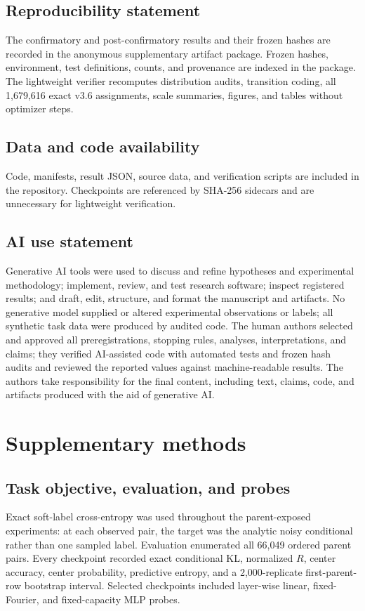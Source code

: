 \documentclass{article}
\begin{document}
\subsection*{Reproducibility statement}
The confirmatory and post-confirmatory results and their frozen hashes are
recorded in the anonymous supplementary artifact package. Frozen hashes,
environment, test definitions, counts, and provenance are indexed in the
package. The lightweight verifier recomputes distribution audits, transition
coding, all 1,679,616 exact v3.6 assignments, scale summaries, figures, and
tables without optimizer steps.

\subsection*{Data and code availability}
Code, manifests, result JSON, source data, and verification scripts are
included in the repository. Checkpoints are referenced by SHA-256 sidecars and
are unnecessary for lightweight verification.

\subsection*{AI use statement}
Generative AI tools were used to discuss and refine hypotheses and experimental
methodology; implement, review, and test research software; inspect registered
results; and draft, edit, structure, and format the manuscript and artifacts.
No generative model supplied or altered experimental observations or labels;
all synthetic task data were produced by audited code. The human authors
selected and approved all
preregistrations, stopping rules, analyses, interpretations, and claims; they
verified AI-assisted code with automated tests and frozen hash audits and
reviewed the reported values against machine-readable results. The authors take
responsibility for the final content, including text, claims, code, and
artifacts produced with the aid of generative AI.




\appendix
\section{Supplementary methods}
\subsection{Task objective, evaluation, and probes}
Exact soft-label cross-entropy was used throughout the parent-exposed
experiments: at each observed pair, the target was the analytic noisy
conditional rather than one sampled label. Evaluation enumerated all
66,049 ordered parent pairs. Every checkpoint recorded exact conditional KL,
normalized $R$, center accuracy, center probability, predictive entropy, and a
2,000-replicate first-parent-row bootstrap interval. Selected checkpoints
included layer-wise linear, fixed-Fourier, and fixed-capacity MLP probes.
\end{document}
